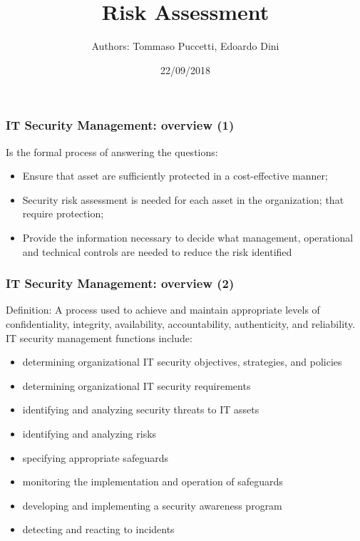 \documentclass[xcolor ={table,usenames,dvipsnames}]{beamer}
\title{Risk Assessment}
\author{Authors: Tommaso Puccetti, Edoardo Dini}
\institute{Universit\`a  degli studi di Firenze}
\date{22/09/2018}
\theoremstyle{definition}
\begin{document}
	
	\begin{frame}
		\maketitle
	\end{frame}
	
	\begin{frame}
		\frametitle{IT Security Management: overview (1)}
		Is the formal process of answering the questions:
		\begin{itemize}
			\item Ensure that asset are sufficiently protected in a cost-effective manner;
			\item Security risk assessment is needed for each asset in the organization;  that require protection;
			\item Provide the information necessary to decide what management, operational and technical controls are needed to reduce the risk identified
		\end{itemize}
	\end{frame}

	\begin{frame}
		\frametitle{IT Security Management: overview (2)}
		\begin{alertblock}{Definition:}
			 A process used to achieve and maintain appropriate levels of confidentiality, integrity, availability, accountability, authenticity, and reliability. IT security management functions include:
		\end{alertblock}
		\begin{itemize}
			\item determining organizational IT security objectives, strategies, and policies
			\item determining organizational IT security requirements
			\item identifying and analyzing security threats to IT assets 
			\item identifying and analyzing risks
			\item specifying appropriate safeguards
			\item monitoring the implementation and operation of safeguards
			\item developing and implementing a security awareness program
			\item detecting and reacting to incidents
		\end{itemize}	
	\end{frame}
\end{document}
